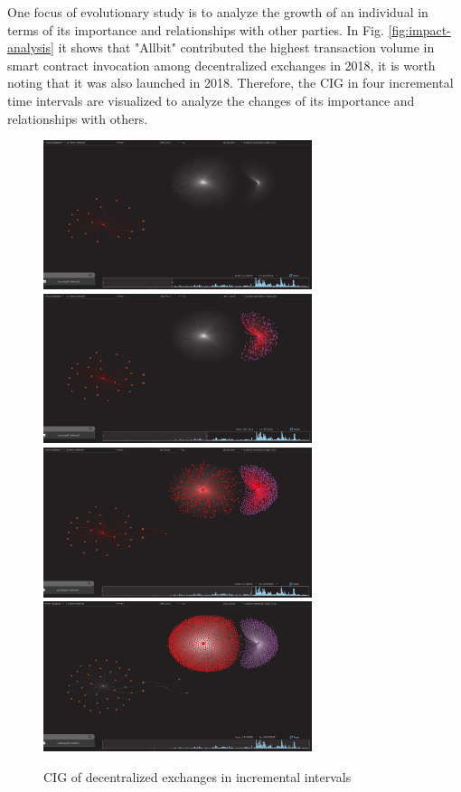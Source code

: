 One focus of evolutionary study is to analyze the growth of an individual in terms of its importance and relationships with other parties. In Fig. \ref{fig:impact-analysis} it shows that "Allbit" contributed the highest transaction volume in smart contract invocation among decentralized exchanges in 2018, it is worth noting that it was also launched in 2018. Therefore, the CIG in four incremental time intervals are visualized to analyze the changes of its importance and relationships with others.

\begin{figure}[htb]
\includegraphics[width=0.7\textwidth]{gfx/evolutionary-study1.png}
\includegraphics[width=0.7\textwidth]{gfx/evolutionary-study2.png}
\includegraphics[width=0.7\textwidth]{gfx/evolutionary-study3.png}
\includegraphics[width=0.7\textwidth]{gfx/evolutionary-study4.png}
\caption{CIG of decentralized exchanges in incremental intervals}
\label{fig:evolutionary-study}
\end{figure}

